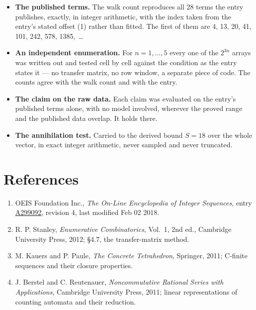 \documentclass[11pt]{article}
\theoremstyle{definition}
\begin{document}
\begin{itemize}

\item {\bfseries The published terms.} The walk count reproduces all 28 terms the entry publishes, exactly, in integer arithmetic, with the index taken from the entry's stated offset (1) rather than fitted. The first of them are 4, 13, 20, 41, 101, 242, 578, 1385,~\dots

\item {\bfseries An independent enumeration.} For $n = 1,\dots,5$ every one of the $2^{3n}$ arrays was written out and tested cell by cell against the condition as the entry states it --- no transfer matrix, no row window, a separate piece of code. The counts agree with the walk count and with the entry.

\item {\bfseries The claim on the raw data.} Each claim was evaluated on the entry's published terms alone, with no model involved, wherever the proved range and the published data overlap. It holds there.

\item {\bfseries The annihilation test.} Carried to the derived bound $S = 18$ over the whole vector, in exact integer arithmetic, never sampled and never truncated.

\end{itemize}

\section{References}

\begin{enumerate}

\item OEIS Foundation Inc., \emph{The On-Line Encyclopedia of Integer Sequences}, entry \href{https://oeis.org/A299092}{A299092}, revision 4, last modified Feb 02 2018.

\item R. P. Stanley, \emph{Enumerative Combinatorics}, Vol.~1, 2nd ed., Cambridge University Press, 2012; \S4.7, the transfer-matrix method.

\item M. Kauers and P. Paule, \emph{The Concrete Tetrahedron}, Springer, 2011; C-finite sequences and their closure properties.

\item J. Berstel and C. Reutenauer, \emph{Noncommutative Rational Series with Applications}, Cambridge University Press, 2011; linear representations of counting automata and their reduction.

\end{enumerate}
\end{document}
